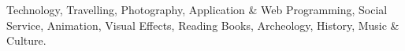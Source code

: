 \begin{cventries}
  \cventry
    {}
    {}
    {}
    {}
    {
      \begin{cvitems}
        \item {Technology, Travelling, Photography, Application \& Web Programming, Social Service, Animation, Visual Effects, Reading Books, Archeology, History, Music \& Culture.}
      \end{cvitems}
    }
\end{cventries}
